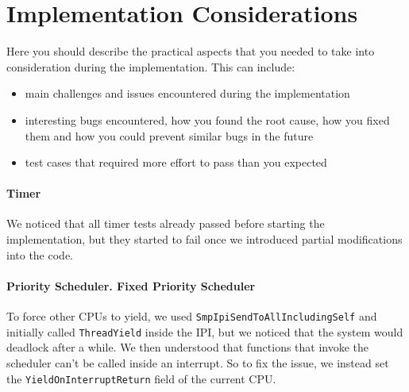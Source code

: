 \subsubsection{\taskA}


\subsubsection{\taskB}


\subsubsection{\taskC}



\section{Implementation Considerations}

Here you should describe the practical aspects that you needed to take into consideration during the implementation.
This can include:

\begin{itemize}
    \item main challenges and issues encountered during the implementation
    \item interesting bugs encountered, how you found the root cause, how you fixed them and how you could prevent similar bugs in the future
    \item test cases that required more effort to pass than you expected
\end{itemize}

\begin{tcolorbox}[title={Example}]
\paragraph{Timer} We noticed that all timer tests already passed before starting the implementation, but they started to fail once
we introduced partial modifications into the code.

\paragraph{Priority Scheduler. Fixed Priority Scheduler}
To force other CPUs to yield, we used \lstinline{SmpIpiSendToAllIncludingSelf} and initially called \lstinline{ThreadYield} inside the IPI,
but we noticed that the system would deadlock after a while. We then understood that functions that invoke the scheduler can't be
called inside an interrupt. So to fix the issue, we instead set the \lstinline{YieldOnInterruptReturn} field of the current CPU.
\end{tcolorbox}

